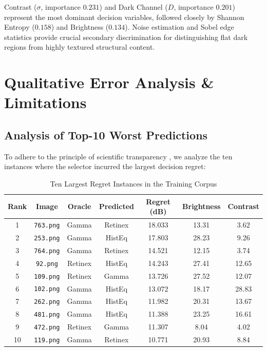 \documentclass[journal]{IEEEtran}
\begin{document}
Contrast ($\sigma$, importance $0.231$) and Dark Channel ($D$, importance $0.201$) represent the most dominant decision variables, followed closely by Shannon Entropy ($0.158$) and Brightness ($0.134$). Noise estimation and Sobel edge statistics provide crucial secondary discrimination for distinguishing flat dark regions from highly textured structural content.

\section{Qualitative Error Analysis \& Limitations}

\subsection{Analysis of Top-10 Worst Predictions}
To adhere to the principle of scientific transparency \cite{dodge2019show}, we analyze the ten instances where the selector incurred the largest decision regret:

\begin{table}[!t]
\centering
\caption{Ten Largest Regret Instances in the Training Corpus}
\label{tab:worst_errors}
\begin{tabular}{ccccccc}
\toprule
\textbf{Rank} & \textbf{Image} & \textbf{Oracle} & \textbf{Predicted} & \textbf{Regret (dB)} & \textbf{Brightness} & \textbf{Contrast} \\
\midrule
1  & \texttt{763.png} & Gamma   & Retinex & 18.033 & 13.31 & 3.62 \\
2  & \texttt{253.png} & Gamma   & HistEq  & 17.803 & 28.23 & 9.26 \\
3  & \texttt{764.png} & Gamma   & Retinex & 14.521 & 12.15 & 3.74 \\
4  & \texttt{92.png}  & Retinex & HistEq  & 14.243 & 27.41 & 12.65 \\
5  & \texttt{109.png} & Retinex & Gamma   & 13.726 & 27.52 & 12.07 \\
6  & \texttt{102.png} & Gamma   & HistEq  & 13.072 & 18.17 & 28.83 \\
7  & \texttt{262.png} & Gamma   & HistEq  & 11.982 & 20.31 & 13.67 \\
8  & \texttt{481.png} & Gamma   & HistEq  & 11.388 & 23.25 & 16.61 \\
9  & \texttt{472.png} & Retinex & Gamma   & 11.307 & 8.04  & 4.02 \\
10 & \texttt{119.png} & Gamma   & Retinex & 10.771 & 20.93 & 8.84 \\
\bottomrule
\end{tabular}
\end{table}
\end{document}
